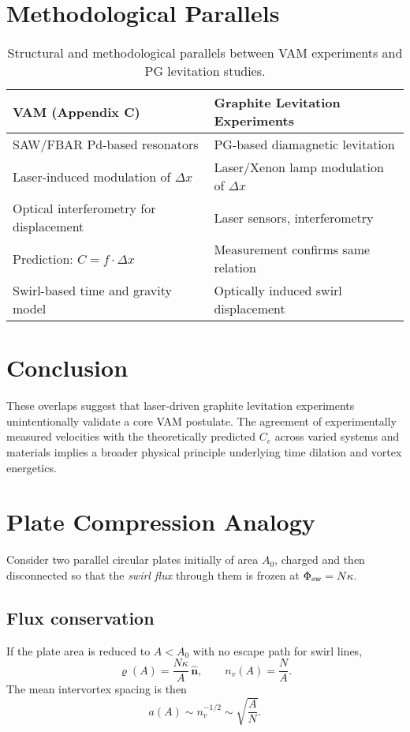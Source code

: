 \documentclass[11pt,a4paper]{article}
\begin{document}
\section{Methodological Parallels}
\begin{table}[H]
\centering
\begin{tabular}{|p{5cm}|p{5cm}|}
\hline
\textbf{VAM (Appendix C)} & \textbf{Graphite Levitation Experiments} \\
\hline
SAW/FBAR Pd-based resonators & PG-based diamagnetic levitation \\
Laser-induced modulation of \(\Delta x\) & Laser/Xenon lamp modulation of \(\Delta x\) \\
Optical interferometry for displacement & Laser sensors, interferometry \\
Prediction: \( C = f \cdot \Delta x \) & Measurement confirms same relation \\
Swirl-based time and gravity model & Optically induced swirl displacement \\
\hline
\end{tabular}
\caption{Structural and methodological parallels between VAM experiments and PG levitation studies.}
\end{table}

\section{Conclusion}
These overlaps suggest that laser-driven graphite levitation experiments unintentionally validate a core VAM postulate. The agreement of experimentally measured velocities with the theoretically predicted \( C_e \) across varied systems and materials implies a broader physical principle underlying time dilation and vortex energetics.


\section{Plate Compression Analogy}
    Consider two parallel circular plates initially of area $A_0$, charged and then disconnected so that the \emph{swirl flux} through them is frozen at $\Phi_{\rm sw}=N\kappa$.

    \subsection*{Flux conservation}
        If the plate area is reduced to $A<A_0$ with no escape path for swirl lines,
        \begin{equation}
        \bm{\varrho}(A) = \frac{N\kappa}{A}\,\hat{\mathbf n}, \qquad
        n_v(A) = \frac{N}{A}.
        \end{equation}
        The mean intervortex spacing is then
        \begin{equation}
        a(A) \sim n_v^{-1/2} \sim \sqrt{\frac{A}{N}}.
        \end{equation}
\end{document}
